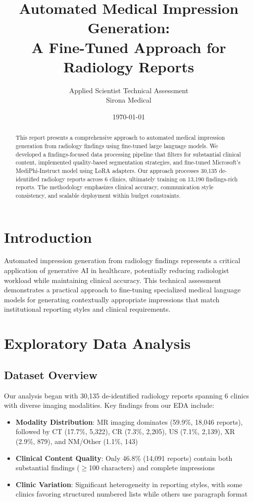 \documentclass[11pt,letterpaper]{article}
\title{Automated Medical Impression Generation:\\
A Fine-Tuned Approach for Radiology Reports}
\author{Applied Scientist Technical Assessment\\Sirona Medical}
\date{\today}
\begin{document}
\maketitle

\begin{abstract}
This report presents a comprehensive approach to automated medical impression generation from radiology findings using fine-tuned large language models. We developed a findings-focused data processing pipeline that filters for substantial clinical content, implemented quality-based segmentation strategies, and fine-tuned Microsoft's MediPhi-Instruct model using LoRA adapters. Our approach processes 30,135 de-identified radiology reports across 6 clinics, ultimately training on 13,190 findings-rich reports. The methodology emphasizes clinical accuracy, communication style consistency, and scalable deployment within budget constraints.
\end{abstract}

\section{Introduction}

Automated impression generation from radiology findings represents a critical application of generative AI in healthcare, potentially reducing radiologist workload while maintaining clinical accuracy. This technical assessment demonstrates a practical approach to fine-tuning specialized medical language models for generating contextually appropriate impressions that match institutional reporting styles and clinical requirements.

\section{Exploratory Data Analysis}

\subsection{Dataset Overview}
Our analysis began with 30,135 de-identified radiology reports spanning 6 clinics with diverse imaging modalities. Key findings from our EDA include:

\begin{itemize}
    \item \textbf{Modality Distribution}: MR imaging dominates (59.9\%, 18,046 reports), followed by CT (17.7\%, 5,322), CR (7.3\%, 2,205), US (7.1\%, 2,139), XR (2.9\%, 879), and NM/Other (1.1\%, 143)
    \item \textbf{Clinical Content Quality}: Only 46.8\% (14,091 reports) contain both substantial findings ($\geq$100 characters) and complete impressions
    \item \textbf{Clinic Variation}: Significant heterogeneity in reporting styles, with some clinics favoring structured numbered lists while others use paragraph format
\end{itemize}
\end{document}
